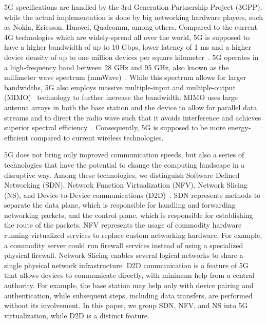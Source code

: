 \documentclass[11pt]{article}
\begin{document}
5G specifications are handled by the 3rd Generation Partnership Project (3GPP),
while the actual implementation is done by big networking hardware players, such
as Nokia, Ericsson, Huawei, Qualcomm, among others. Compared to the current 4G
technologies which are widely-spread all over the world, 5G is supposed to have
a higher bandwidth of up to 10 Gbps, lower latency of 1 ms and a higher device
density of up to one million devices per square
kilometer~\cite{5g_our_article,5g_ch_opp}. 5G operates in a high-frequency band
between 28 GHz and 95 GHz, also known as the millimeter wave spectrum
(mmWave)~\cite{5g_our_article,5g_ch_opp}. While this spectrum allows for larger
bandwidths, 5G also employs massive multiple-input and multiple-output
(MIMO)~\cite{5g_our_article} technology to further increase the bandwidth. MIMO
uses large antenna arrays in both the base station and the device to allow for
parallel data streams and to direct the radio wave such that it avoids
interference and achieves superior spectral efficiency~\cite{5g_our_article}.
Consequently, 5G is supposed to be more energy-efficient compared to current
wireless technologies.

5G does not bring only improved communication speeds, but also a series of
technologies that have the potential to change the computing landscape in a
disruptive way. Among these technologies, we distinguish Software Defined
Networking (SDN), Network Function Virtualization (NFV), Network Slicing (NS),
and Device-to-Device communications (D2D)~\cite{edge_mec_survey_2017}. SDN
represents methods to separate the data plane, which is responsible for handling
and forwarding networking packets, and the control plane, which is responsible
for establishing the route of the packets. NFV represents the usage of commodity
hardware running virtualized services to replace custom networking hardware. For
example, a commodity server could run firewall services instead of using a
specialized physical firewall. Network Slicing enables several logical networks
to share a single physical network infrastructure. D2D communication is a
feature of 5G that allows devices to communicate directly, with minimum help
from a central authority. For example, the base station may help only with
device pairing and authentication, while subsequent steps, including data
transfers, are performed without its involvement. In this paper, we group SDN,
NFV, and NS into 5G virtualization, while D2D is a distinct feature.

\vspace{-1mm}
\end{document}
